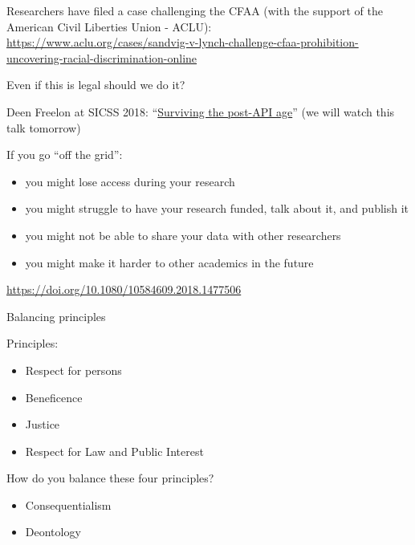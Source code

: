 \documentclass{beamer}
\def\vf{\vfill}
\begin{document}
\begin{frame}

Researchers have filed a case challenging the CFAA (with the support of the American Civil Liberties Union - ACLU):\\
\vspace{2mm}
\tiny{\textcolor{blue}{\url{https://www.aclu.org/cases/sandvig-v-lynch-challenge-cfaa-prohibition-uncovering-racial-discrimination-online}}}

\end{frame}
\begin{frame}{Even if this is legal should we do it?}

 

Deen Freelon at SICSS 2018: ``\textcolor{blue}{\href{https://www.youtube.com/watch?v=GWpCHh54pXU}{Surviving the post-API age}}'' (we will watch this talk tomorrow)




If you go ``off the grid'': 
\begin{itemize}
\item you might lose access during your research
\item you might struggle to have your research funded, talk about it, and publish it
\item you might not be able to share your data with other researchers
\item you might make it harder to other academics in the future
\end{itemize}

\vf
\tiny{\url{https://doi.org/10.1080/10584609.2018.1477506}}
\end{frame}
\begin{frame}{Balancing principles}

Principles:
\begin{itemize}
\item Respect for persons
\item Beneficence
\item Justice
\item Respect for Law and Public Interest
\end{itemize}

\vf
How do you balance these four principles?

\begin{itemize}
	\item Consequentialism
	\item Deontology
\end{itemize}


\end{frame}
\end{document}
